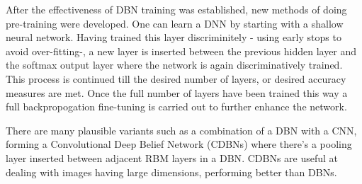 After the effectiveness of DBN training was established, new methods of doing pre-training were developed. 
One can learn a DNN by starting with a shallow neural network.
Having trained this layer discriminitely - using early stops to avoid over-fitting-, a new layer is inserted between the previous hidden layer and the softmax output layer where the network is again discriminatively trained.
This process is continued till the desired number of layers, or desired accuracy measures are met.
Once the full number of layers have been trained this way a full backpropogation fine-tuning is carried out to further enhance the network\citep{dengthree}.

There are many plausible variants such as a combination of a DBN with a CNN, forming a Convolutional Deep Belief Network (CDBNs) where there’s a pooling layer inserted between adjacent RBM layers in a DBN\citep{mo2012survey}.
CDBNs are useful at dealing with images having large dimensions, performing better than DBNs\citep{mo2012survey}.





